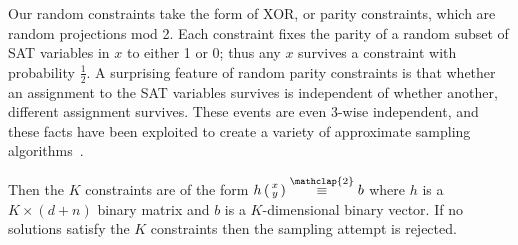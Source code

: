 \documentclass{article}
\newcommand\modt{\stackrel{\mathclap{\normalfont 2}}{\equiv}}
\begin{document}
  Our random constraints take the form of XOR, or parity constraints, which are random projections mod 2.
  Each constraint fixes the parity of a random subset of SAT variables in $x$ to either 1 or 0;
  thus any $x$ survives a constraint with probability $\frac{1}{2}$.
  A surprising feature of random parity constraints is that whether an assignment to the SAT variables survives is independent of whether another, different assignment survives.
  These events are even 3-wise independent, and these facts have been exploited to create a variety of approximate sampling algorithms~\cite{gomes2006near,valiant1985np,chakraborty2014balancing,gomes2006model}.
  
  Then the $K$ constraints are of the form $h\left(\begin{smallmatrix}x\\y\end{smallmatrix}\right) \modt b$ where $h$ is a $K\times (d+n)$ binary matrix and $b$ is a $K$-dimensional binary vector.
  If no solutions satisfy the $K$ constraints then the sampling attempt is rejected.
\end{document}
